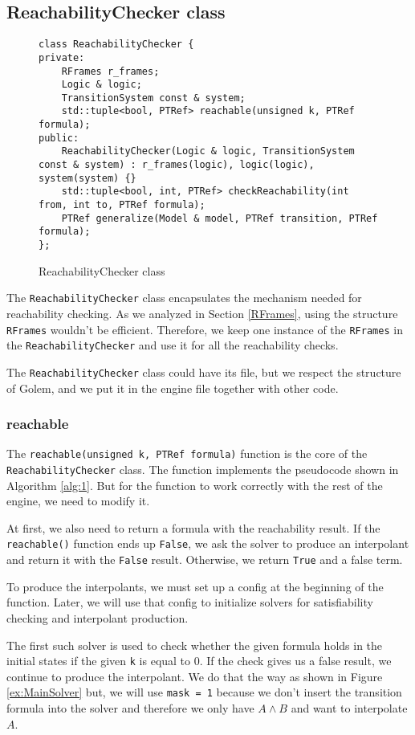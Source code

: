 \subsection{ReachabilityChecker class}
\begin{figure}[H]
\begin{lstlisting}
class ReachabilityChecker {
private:
    RFrames r_frames;
    Logic & logic;
    TransitionSystem const & system;
    std::tuple<bool, PTRef> reachable(unsigned k, PTRef formula);
public:
    ReachabilityChecker(Logic & logic, TransitionSystem const & system) : r_frames(logic), logic(logic), system(system) {}
    std::tuple<bool, int, PTRef> checkReachability(int from, int to, PTRef formula);
    PTRef generalize(Model & model, PTRef transition, PTRef formula);
};
\end{lstlisting}
\caption{ReachabilityChecker class}\label{code:ReachClass}
\end{figure}
The \texttt{ReachabilityChecker} class encapsulates the mechanism needed for reachability checking.
\noindent As we analyzed in Section \ref{RFrames}, using the structure \texttt{RFrames} wouldn't be efficient. Therefore, we keep one instance of the \texttt{RFrames} in the \texttt{ReachabilityChecker} and use it for all the reachability checks. 

The \texttt{ReachabilityChecker} class could have its file, but we respect the structure of Golem, and we put it in the engine file together with other code.
\subsubsection{reachable}
The \texttt{reachable(unsigned k, PTRef formula)} function is the core of the \texttt{ReachabilityChecker} class. The function implements the pseudocode shown in Algorithm \ref{alg:1}. But for the function to work correctly with the rest of the engine, we need to modify it.

At first, we also need to return a formula with the reachability result. If the \texttt{reachable()} function ends up \texttt{False}, we ask the solver to produce an interpolant and return it with the \texttt{False} result. Otherwise, we return \texttt{True} and a false term.

To produce the interpolants, we must set up a config at the beginning of the function. Later, we will use that config to initialize solvers for satisfiability checking and interpolant production. 

The first such solver is used to check whether the given formula holds in the initial states if the given \texttt{k} is equal to 0. If the check gives us a false result, we continue to produce the interpolant. We do that the way as shown in Figure \ref{ex:MainSolver} but, we will use \texttt{mask = 1} because we don't insert the transition formula into the solver and therefore we only have $A \wedge B$ and want to interpolate $A$. 

